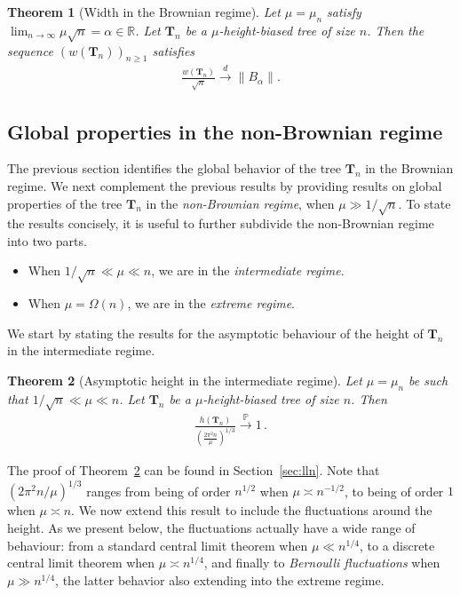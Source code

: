 \documentclass{article}
\newcommand{\1}{\mathbbm{1}}								%
\newtheorem{theorem}{Theorem}[section]
\theoremstyle{definition}
\numberwithin{equation}{section}
\newcommand{\R}{\mathbb R}
\newcommand{\toindis}{\overset d\longrightarrow}
\newcommand{\toinp}{\overset{\mathbb P}{\longrightarrow}}
\begin{document}
\begin{theorem}[Width in the Brownian regime]\label{thm:width_scaling_Brownian}
    Let $\mu=\mu_n$ satisfy $\lim_{n\rightarrow\infty}\mu\sqrt{n}=\alpha\in\R$.
    Let $\mathbf{T}_n$ be a $\mu$-height-biased tree of size $n$.
    Then the sequence $(w(\mathbf{T}_n))_{n \geq 1}$ satisfies
        \begin{align*}
            \frac{w(\mathbf{T}_n)}{\sqrt{n}} \toindis \|B_\alpha\|.
        \end{align*}
\end{theorem}

\subsection{Global properties in the non-Brownian regime}
The previous section identifies the global behavior of the tree $\mathbf{T}_n$ in the Brownian regime. We next complement the previous results by providing results on global properties of the tree $\mathbf{T}_n$ in the \emph{non-Brownian regime}, when $\mu\gg 1/\sqrt{n}$.
To state the results concisely, it is useful to further subdivide the non-Brownian regime into two parts.
\begin{itemize}
    \item When $1/\sqrt{n}\ll \mu \ll n$, we are in the \emph{intermediate regime}.
    \item When $\mu= \Omega(n)$, we are in the \emph{extreme regime}.
\end{itemize}

We start by stating the results for the asymptotic behaviour of the height of $\mathbf{T}_n$ in the intermediate regime. 


\begin{theorem}[Asymptotic height in the intermediate regime]\label{thm:inter lln}
    Let $\mu=\mu_n$ be such that $1/\sqrt{n}\ll\mu\ll n$.
    Let $\mathbf{T}_n$ be a $\mu$-height-biased tree of size $n$.
    Then
    \begin{align*}
        \frac{h(\mathbf{T}_n)}{\left(\frac{2\pi^2n}{\mu}\right)^{1/3}}\toinp 1\,.
    \end{align*}
\end{theorem}
The proof of Theorem~\ref{thm:inter lln} can be found in Section~\ref{sec:lln}.
Note that $(2\pi^2n/\mu)^{1/3}$ ranges from being of order $n^{1/2}$ when $\mu \asymp n^{-1/2}$, to being of order $1$ when $\mu \asymp n$.
We now extend this result to include the fluctuations around the height.
As we present below, the fluctuations actually have a wide range of behaviour: from a standard central limit theorem when $\mu\ll n^{1/4}$, to a discrete central limit theorem when $\mu\asymp n^{1/4}$, and finally to \emph{Bernoulli fluctuations} when $\mu\gg n^{1/4}$, the latter behavior also extending into the extreme regime.
\end{document}
